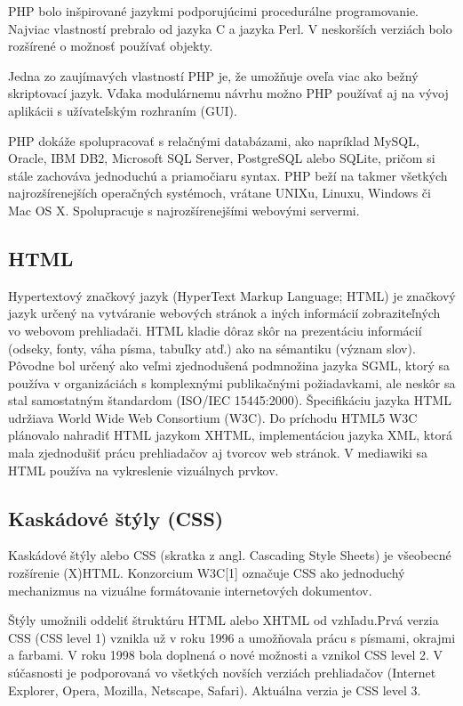 PHP bolo inšpirované jazykmi podporujúcimi procedurálne programovanie. Najviac vlastností prebralo od jazyka C a jazyka Perl. V neskorších verziách bolo rozšírené o možnosť používať objekty.

Jedna zo zaujímavých vlastností PHP je, že umožňuje oveľa viac ako bežný skriptovací jazyk. Vďaka modulárnemu návrhu možno PHP používať aj na vývoj aplikácii s užívateľským rozhraním (GUI).

PHP dokáže spolupracovať s relačnými databázami, ako napríklad MySQL, Oracle, IBM DB2, Microsoft SQL Server, PostgreSQL alebo SQLite, pričom si stále zachováva jednoduchú a priamočiaru syntax. PHP beží na takmer všetkých najrozšírenejších operačných systémoch, vrátane UNIXu, Linuxu, Windows či Mac OS X. Spolupracuje s najrozšírenejšími webovými servermi.

\subsection{HTML}
Hypertextový značkový jazyk (HyperText Markup Language; HTML) je značkový jazyk určený na vytváranie webových stránok a iných informácií zobraziteľných vo webovom prehliadači. HTML kladie dôraz skôr na prezentáciu informácií (odseky, fonty, váha písma, tabuľky atď.) ako na sémantiku (význam slov).
Pôvodne bol určený ako veľmi zjednodušená podmnožina jazyka SGML, ktorý sa používa v organizáciách s komplexnými publikačnými požiadavkami, ale neskôr sa stal samostatným štandardom (ISO/IEC 15445:2000).
Špecifikáciu jazyka HTML udržiava World Wide Web Consortium (W3C).
Do príchodu HTML5 W3C plánovalo nahradiť HTML jazykom XHTML, implementáciou jazyka XML, ktorá mala zjednodušiť prácu prehliadačov aj tvorcov web stránok.
V mediawiki sa HTML používa na vykreslenie vizuálnych prvkov.

\subsection{Kaskádové štýly (CSS)}
Kaskádové štýly alebo CSS (skratka z angl. Cascading Style Sheets) je všeobecné rozšírenie (X)HTML. Konzorcium W3C[1] označuje CSS ako jednoduchý mechanizmus na vizuálne formátovanie internetových dokumentov.

Štýly umožnili oddeliť štruktúru HTML alebo XHTML od vzhľadu.Prvá verzia CSS (CSS level 1) vznikla už v roku 1996 a umožňovala prácu s písmami, okrajmi a farbami. V roku 1998 bola doplnená o nové možnosti a vznikol CSS level 2. V súčasnosti je podporovaná vo všetkých novších verziách prehliadačov (Internet Explorer, Opera, Mozilla, Netscape, Safari). Aktuálna verzia je CSS level 3.

